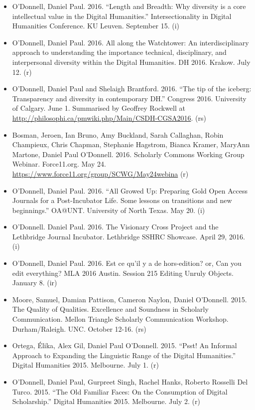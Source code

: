 \documentclass[12pt]{article}
\begin{document}
\begin{itemize}
  \item O’Donnell, Daniel Paul. 2016. “Length and Breadth: Why diversity is a core intellectual value in the Digital Humanities.” Intersectionality in Digital Humanities Conference. KU Leuven. September 15. (i)
  \item O’Donnell, Daniel Paul. 2016. All along the Watchtower: An interdisciplinary approach to understanding the importance technical, disciplinary, and interpersonal diversity within the Digital Humanities. DH 2016. Krakow. July 12. (r)
  \item O’Donnell, Daniel Paul and Shelaigh Brantford. 2016. “The tip of the iceberg: Transparency and diversity in contemporary DH.” Congress 2016. University of Calgary. June 1. Summarised by Geoffrey Rockwell at \url{http://philosophi.ca/pmwiki.php/Main/CSDH-CGSA2016}. (rs)
  \item Bosman, Jeroen, Ian Bruno, Amy Buckland, Sarah Callaghan, Robin Champieux, Chris Chapman, Stephanie Hagstrom, Bianca Kramer, MaryAnn Martone, Daniel Paul O'Donnell. 2016. Scholarly Commons Working Group Webinar. Force11.org. May 24. \url{https://www.force11.org/group/SCWG/May24webina} (r)
  \item O’Donnell, Daniel Paul. 2016. “All Growed Up: Preparing Gold Open Access Journals for a Post-Incubator Life. Some lessons on transitions and new beginnings.” OA@UNT. University of North Texas. May 20. (i)
  \item O’Donnell. Daniel Paul. 2016. The Visionary Cross Project and the Lethbridge Journal Incubator. Lethbridge SSHRC Showcase. April 29, 2016. (i)
  \item O’Donnell, Daniel Paul. 2016. Est ce qu’il y a de hors-edition? or, Can you edit everything? MLA 2016 Austin. Session 215 Editing Unruly Objects. January 8. (ir)
  \item Moore\*, Samuel, Damian Pattison, Cameron Naylon, Daniel O'Donnell. 2015. The Quality of Qualities. Excellence and Soundness in Scholarly Communication. Mellon Triangle Scholarly Communication Workshop. Durham/Raleigh. UNC. October 12-16. (rs)
  \item Ortega, Élika, Alex Gil, Daniel Paul O'Donnell. 2015. “Psst! An Informal Approach to Expanding the Linguistic Range of the Digital Humanities.” Digital Humanities 2015. Melbourne. July 1. (r)
  \item O'Donnell, Daniel Paul, Gurpreet Singh\*, Rachel Hanks\*, Roberto Rosselli Del Turco. 2015. “The Old Familiar Faces: On the Consumption of Digital Scholarship.” Digital Humanities 2015. Melbourne. July 2. (r)

\end{itemize}
\end{document}
